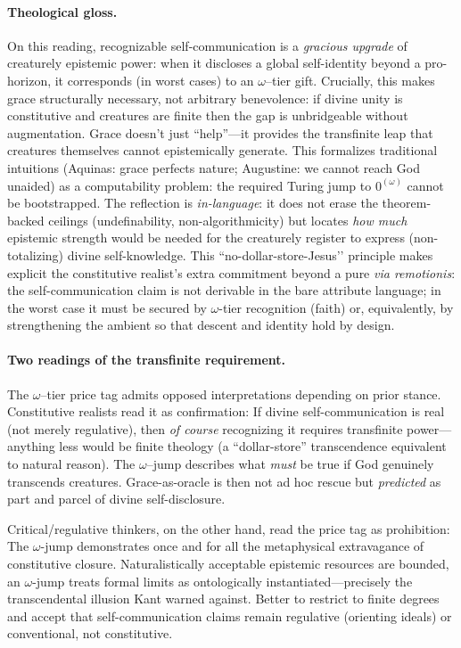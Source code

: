 \documentclass[11pt]{article}
\theoremstyle{upright}
\begin{document}
\paragraph{Theological gloss.}
On this reading, recognizable self-communication is a \emph{gracious upgrade} of creaturely epistemic power: when it discloses a global self-identity beyond a pro-horizon, it corresponds (in worst cases) to an $\omega$–tier gift. Crucially, this makes grace structurally necessary, not arbitrary benevolence: if divine unity is constitutive and creatures are finite then the gap is unbridgeable without augmentation. Grace doesn't just ``help''—it provides the transfinite leap that creatures themselves cannot epistemically generate. This formalizes traditional intuitions (Aquinas: grace perfects nature; Augustine: we cannot reach God unaided) as a computability problem: the required Turing jump to $0^{(\omega)}$ cannot be bootstrapped. The reflection is \emph{in-language}: it does not erase the theorem-backed ceilings (undefinability, non-algorithmicity) but locates \emph{how much} epistemic strength would be needed for the creaturely register to express (non-totalizing) divine self-knowledge. 
This “no-dollar-store-Jesus’’ principle makes explicit the constitutive realist’s extra commitment beyond a pure \emph{via remotionis}: the self-communication claim is not derivable in the bare attribute language; in the worst case it must be secured by $\omega$-tier recognition (faith) or, equivalently, by strengthening the ambient so that descent and identity hold by design.

\paragraph{Two readings of the transfinite requirement.} The $\omega$–tier price tag admits opposed interpretations depending on prior stance.
Constitutive realists read it as confirmation: If divine self-communication is real (not merely regulative), then \emph{of course} recognizing it requires transfinite power—anything less would be finite theology (a ``dollar-store'' transcendence equivalent to natural reason). The $\omega$–jump describes what \emph{must} be true if God genuinely transcends creatures. Grace-as-oracle is then not ad hoc rescue but \emph{predicted} as part and parcel of divine self-disclosure.

Critical/regulative thinkers, on the other hand, read the price tag as prohibition: The $\omega$-jump demonstrates once and for all the metaphysical extravagance of constitutive closure. Naturalistically acceptable epistemic resources are bounded, an $\omega$-jump treats formal limits as ontologically instantiated---precisely the transcendental illusion Kant warned against. Better to restrict to finite degrees and accept that self-communication claims remain regulative (orienting ideals) or conventional, not constitutive.
\end{document}
